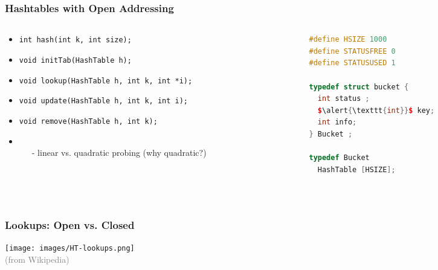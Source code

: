 \documentclass[aspectratio=169]{beamer}
\begin{document}
\begin{frame}[fragile]\frametitle{Hashtables with Open Addressing}
\begin{columns}
\begin{column}{.71\textwidth}
%
\begin{itemize}
  \item \texttt{int hash(\alert{\texttt{int}} k, int size);}
  \item \texttt{void initTab(HashTable h);}
  \item \texttt{void lookup(HashTable h, \alert{\texttt{int}} k, int *i);}
  \item \texttt{void update(HashTable h, \alert{\texttt{int}} k, int i);}
  \item \textcolor{black!40}{
          \texttt{void remove(HashTable h, \alert{\texttt{int}} k);}}
  \item {}
          \\~~~- linear vs. quadratic probing (why quadratic?)
\end{itemize}
%
\end{column}
\begin{column}{.34\textwidth}
%
\begin{lstlisting}[language=C++,emph={HashTable,Bucket}]
#define HSIZE 1000
#define STATUSFREE 0
#define STATUSUSED 1

typedef struct bucket {
  int status ;
  $\alert{\texttt{int}}$ key;
  int info;
} Bucket ;

typedef Bucket
  HashTable [HSIZE];
\end{lstlisting}
%
\end{column}
\end{columns}

~\\[-7mm]
\end{frame}



\begin{frame}\frametitle{Lookups: Open vs. Closed}
  \centering
  \texttt{[image: images/HT-lookups.png]}
  \\
  {\footnotesize \textcolor{gray}{(from Wikipedia)}}
\end{frame}
    
\end{document}
